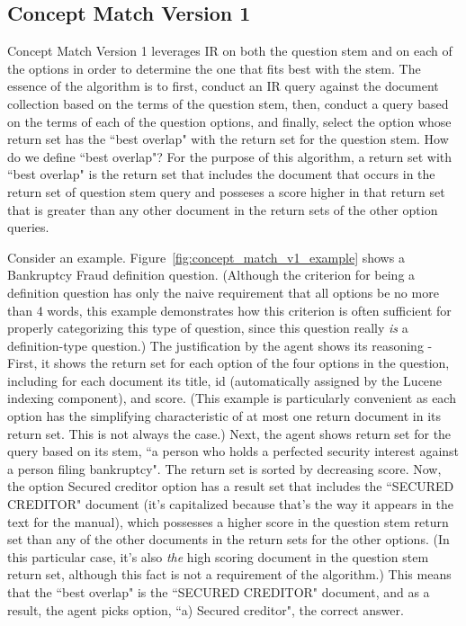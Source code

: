 \subsection{Concept Match Version 1}

Concept Match Version 1 leverages IR on both the question stem and on each of the options in order to determine the one that fits best with the stem.  The essence of the algorithm is to first, conduct an IR query against the document collection based on the terms of the question stem, then, conduct a query based on the terms of each of the question options, and finally, select the option whose return set has the ``best overlap" with the return set for the question stem.  How do we define ``best overlap"?  For the purpose of this algorithm, a return set with ``best overlap" is the return set that includes the document that occurs in the return set of question stem query and posseses a score higher in that return set that is greater than any other document in the return sets of the other option queries.

Consider an example.  Figure~\ref{fig:concept_match_v1_example} shows a Bankruptcy Fraud definition question.  (Although the criterion for being a definition question has only the naive requirement that all options be no more than 4 words, this example demonstrates how this criterion is often sufficient for properly categorizing this type of question, since this question really \emph{is} a definition-type question.)  The justification by the agent shows its reasoning - First, it shows the return set for each option of the four options in the question, including for each document its title, id (automatically assigned by the Lucene indexing component), and score.  (This example is particularly convenient as each option has the simplifying characteristic of at most one return document in its return set.  This is not always the case.)  Next, the agent shows return set for the query based on its stem, ``a person who holds a perfected security interest against a person filing bankruptcy".  The return set is sorted by decreasing score.  Now, the option Secured creditor option has a result set that includes the ``SECURED CREDITOR" document (it's capitalized because that's the way it appears in the text for the manual), which possesses a higher score in the question stem return set than any of the other documents in the return sets for the other options.  (In this particular case, it's also \emph{the} high scoring document in the question stem return set, although this fact is not a requirement of the algorithm.)  This means that the ``best overlap" is the ``SECURED CREDITOR" document, and as a result, the agent picks option, ``a) Secured creditor", the correct answer.

